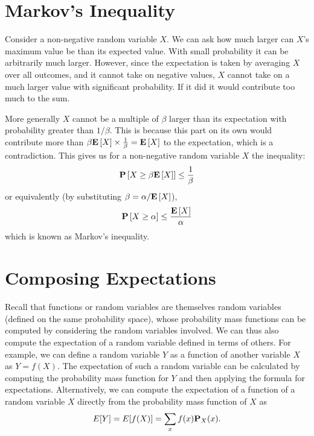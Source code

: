 \section{Markov's Inequality}
\label{sec:probability::expectation::markov}

\begin{gram}
Consider a non-negative random variable $X$.  We can ask how much
larger can $X$'s maximum value be than its expected value.  With small
probability it can be arbitrarily much larger.  However, since the
expectation is taken by averaging $X$ over all outcomes, and it cannot
take on negative values, $X$ cannot take on a much larger value with
significant probability.  If it did it would contribute too much to
the sum.
\end{gram}

\begin{exercise} 
\end{exercise} 

\begin{gram}
More generally $X$ cannot be a multiple of $\beta$ larger than its
expectation with probability greater than $1/\beta$.  This is because
this part on its own would contribute more than $\beta \mathbf{E}\left[{X}\right]
\times \frac{1}{\beta} = \mathbf{E}\left[{X}\right]$ to the expectation, which is a
contradiction.  This gives us for a non-negative random variable $X$
the inequality:
\[ \mathbf{P}\left[{X \geq \beta\mathbf{E}\left[{X}\right]}\right] \leq \frac{1}{\beta} \]
or equivalently (by substituting $\beta = \alpha/\mathbf{E}\left[{X}\right]$),
\[ \mathbf{P}\left[{X \geq \alpha}\right] \leq \frac{\mathbf{E}\left[{X}\right]}{\alpha} \]
which is known as Markov's inequality.
\end{gram}


\section{Composing Expectations}
\label{sec:probability::expectation::compose}
\begin{gram}
Recall that functions or random variables are themselves random
variables (defined on the same probability space), whose probability
mass functions can be computed by considering the random variables
involved.
%
We can thus also compute the expectation of a random variable defined
in terms of others.
%
For example, we can define a random variable $Y$ as a function of
another variable $X$ as $Y = f(X)$.
%
The expectation of such a random variable can be calculated by
computing the probability mass function for $Y$ and then applying the
formula for expectations.
%
Alternatively, we can compute the expectation of a function of a
random variable $X$ directly from the probability mass function of $X$
as
\[
E[Y] = E[f(X)] = \sum_{x}{f(x) \mathbf{P}_{X}(x)}.
\] 
\end{gram}

